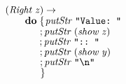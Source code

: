 \documentclass[10pt]{article}
\newcommand{\Conid}[1]{\mathit{#1}}
\newcommand{\Varid}[1]{\mathit{#1}}
\begin{document}
\begin{tabbing}
${\hskip1.00em\relax\phantom{\Varid{interpret}\;\Varid{t}\mathrel{=}\mbox{}}\hskip6.00em\relax(\Conid{Right}\;\Varid{z})\to }$\\
${\hskip1.00em\relax\phantom{\Varid{interpret}\;\Varid{t}\mathrel{=}\mbox{}}\hskip6.00em\relax\hskip2.00em\relax\mathbf{do}\;\{\mskip1.5mu \Varid{putStr}\;\text{\tt \char34 Value:~\char34}}$\\
${\hskip1.00em\relax\phantom{\Varid{interpret}\;\Varid{t}\mathrel{=}\mbox{}}\hskip6.00em\relax\hskip2.00em\relax\phantom{\mathbf{do}\;\mbox{}};\Varid{putStr}\;(\Varid{show}\;\Varid{z})}$\\
${\hskip1.00em\relax\phantom{\Varid{interpret}\;\Varid{t}\mathrel{=}\mbox{}}\hskip6.00em\relax\hskip2.00em\relax\phantom{\mathbf{do}\;\mbox{}};\Varid{putStr}\;\text{\tt \char34 ::~\char34}}$\\
${\hskip1.00em\relax\phantom{\Varid{interpret}\;\Varid{t}\mathrel{=}\mbox{}}\hskip6.00em\relax\hskip2.00em\relax\phantom{\mathbf{do}\;\mbox{}};\Varid{putStr}\;(\Varid{show}\;\Varid{y})}$\\
${\hskip1.00em\relax\phantom{\Varid{interpret}\;\Varid{t}\mathrel{=}\mbox{}}\hskip6.00em\relax\hskip2.00em\relax\phantom{\mathbf{do}\;\mbox{}};\Varid{putStr}\;\text{\tt \char34 \char92 n\char34}}$\\
${\hskip1.00em\relax\phantom{\Varid{interpret}\;\Varid{t}\mathrel{=}\mbox{}}\hskip6.00em\relax\hskip2.00em\relax\phantom{\mathbf{do}\;\mbox{}}\mskip1.5mu\}}$
\end{tabbing}

\end{document}
